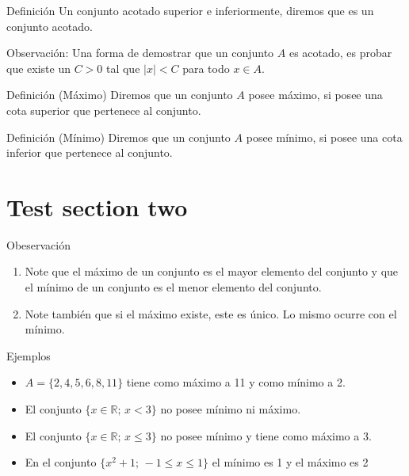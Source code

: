 \documentclass[5pt]{beamer} %
\begin{document}
\begin{frame}
	\begin{block}{Definición} Un conjunto acotado superior e inferiormente, diremos que es un conjunto acotado.
		\end{block}
	
	Observación: Una forma de demostrar que un conjunto $A$ es acotado, es probar que existe un $C>0$ tal que $|x| < C$ para todo $x\in A$.
	
	\begin{block}{Definición (Máximo)}
		Diremos que un conjunto $A$ posee máximo, si posee una cota superior
		que pertenece al conjunto.\end{block}
	
	\begin{block}{Definición (Mínimo)}
	Diremos que un conjunto $A$ posee mínimo, si posee una cota inferior que
	pertenece al conjunto.
\end{block}
\end{frame}
\section{Test section two}
\begin{frame}		
\begin{alertblock}{Obeservación}
\begin{enumerate}
	\item Note que el máximo de un conjunto es el mayor elemento del conjunto
	y que el mínimo de un conjunto es el menor elemento del conjunto.
	
	\item Note también que si el máximo existe, este es único. Lo mismo ocurre con el mínimo.
\end{enumerate}
	\end{alertblock}			

	\begin{exampleblock}{Ejemplos}
		\begin{itemize}
			\item $A=\{2,4,5,6,8,11\}$ tiene como máximo a 11 y como mínimo a 2.
			\item El conjunto $\{x\in\mathbb{R};\, x<3\}$ no posee mínimo ni máximo.
			\item El conjunto $\{x\in\mathbb{R};\, x\leq3\}$ no posee mínimo y tiene como máximo a 3.
			
			\item En el conjunto $\{x^2+1;\, -1\leq x\leq 1\}$ el mínimo es 1 y el máximo es 2
		\end{itemize}
	\end{exampleblock}
	
\end{frame}
\end{document}
